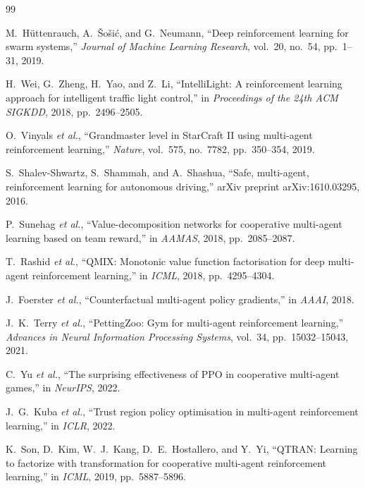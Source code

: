 \documentclass[journal]{IEEEtran}
\begin{document}

\begin{thebibliography}{99}

M.~H\"{u}ttenrauch, A.~\v{S}o\v{s}i\'{c}, and G.~Neumann,
``Deep reinforcement learning for swarm systems,''
\emph{Journal of Machine Learning Research}, vol.~20, no.~54, pp.~1--31, 2019.

H.~Wei, G.~Zheng, H.~Yao, and Z.~Li,
``IntelliLight: A reinforcement learning approach for intelligent traffic light control,''
in \emph{Proceedings of the 24th ACM SIGKDD}, 2018, pp.~2496--2505.

O.~Vinyals \emph{et al.},
``Grandmaster level in StarCraft II using multi-agent reinforcement learning,''
\emph{Nature}, vol.~575, no.~7782, pp.~350--354, 2019.

S.~Shalev-Shwartz, S.~Shammah, and A.~Shashua,
``Safe, multi-agent, reinforcement learning for autonomous driving,''
arXiv preprint arXiv:1610.03295, 2016.

P.~Sunehag \emph{et al.},
``Value-decomposition networks for cooperative multi-agent learning based on team reward,''
in \emph{AAMAS}, 2018, pp.~2085--2087.

T.~Rashid \emph{et al.},
``QMIX: Monotonic value function factorisation for deep multi-agent reinforcement learning,''
in \emph{ICML}, 2018, pp.~4295--4304.

J.~Foerster \emph{et al.},
``Counterfactual multi-agent policy gradients,''
in \emph{AAAI}, 2018.

J.~K.~Terry \emph{et al.},
``PettingZoo: Gym for multi-agent reinforcement learning,''
\emph{Advances in Neural Information Processing Systems}, vol.~34, pp.~15032--15043, 2021.

C.~Yu \emph{et al.},
``The surprising effectiveness of PPO in cooperative multi-agent games,''
in \emph{NeurIPS}, 2022.

J.~G.~Kuba \emph{et al.},
``Trust region policy optimisation in multi-agent reinforcement learning,''
in \emph{ICLR}, 2022.

K.~Son, D.~Kim, W.~J.~Kang, D.~E.~Hostallero, and Y.~Yi,
``QTRAN: Learning to factorize with transformation for cooperative multi-agent reinforcement learning,''
in \emph{ICML}, 2019, pp.~5887--5896.


\end{thebibliography}
\end{document}
